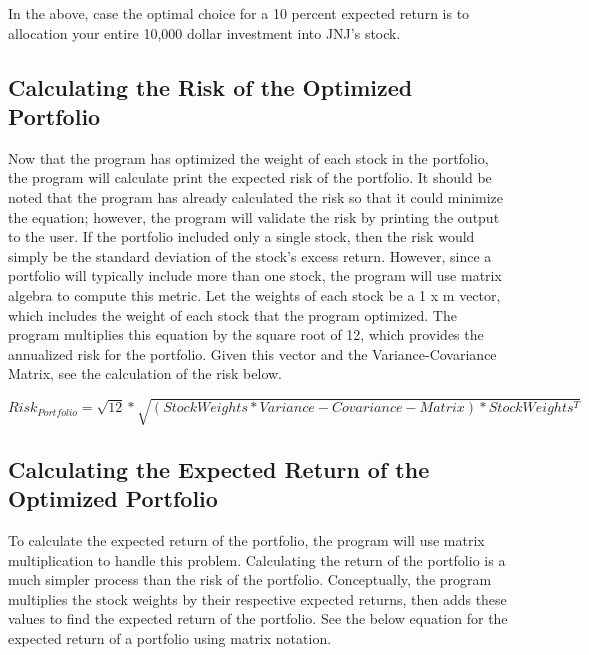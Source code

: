 \documentclass[12pt,english]{article}
\begin{document}
\begin{doublespace}
            \indent{}
            In the above, case the optimal choice for a 10 percent expected return is to allocation your entire 10,000 dollar investment into JNJ’s stock.
                
        \subsection{Calculating the Risk of the Optimized Portfolio}
            
            \indent{}\indent{}
            Now that the program has optimized the weight of each stock in the portfolio, the program will calculate print the expected risk of the portfolio. It should be noted that the program has already calculated the risk so that it could minimize the equation; however, the program will validate the risk by printing the output to the user. If the portfolio included only a single stock, then the risk would simply be the standard deviation of the stock’s excess return. However, since a portfolio will typically include more than one stock, the program will use matrix algebra to compute this metric. Let the weights of each stock be a 1 x m vector, which includes the weight of each stock that the program optimized. The program multiplies this equation by the square root of 12, which provides the annualized risk for the portfolio. Given this vector and the Variance-Covariance Matrix, see the calculation of the risk below.
            
                \begin{center}
                    \begin{equation} \label{Portfolio Risk}
                        Risk_{Portfolio} = 
                        \sqrt{12} * \sqrt{(StockWeights * Variance-Covariance-Matrix) * StockWeights^{T}}
                    \end{equation}
                \end{center}
        
        \subsection{Calculating the Expected Return of the Optimized Portfolio} 

            \indent{}\indent{}
            To calculate the expected return of the portfolio, the program will use matrix multiplication to handle this problem. Calculating the return of the portfolio is a much simpler process than the risk of the portfolio. Conceptually, the program multiplies the stock weights by their respective expected returns, then adds these values to find the expected return of the portfolio. See the below equation for the expected return of a portfolio using matrix notation.
            	

\end{doublespace}
\end{document}

